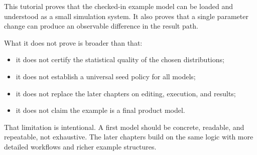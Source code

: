 This tutorial proves that the checked-in example model can be loaded and
understood as a small simulation system. It also proves that a single
parameter change can produce an observable difference in the result path.

What it does not prove is broader than that:
\begin{itemize}
\item it does not certify the statistical quality of the chosen distributions;
\item it does not establish a universal seed policy for all models;
\item it does not replace the later chapters on editing, execution, and results;
\item it does not claim the example is a final product model.
\end{itemize}

That limitation is intentional. A first model should be concrete, readable, and
repeatable, not exhaustive. The later chapters build on the same logic with
more detailed workflows and richer example structures.
